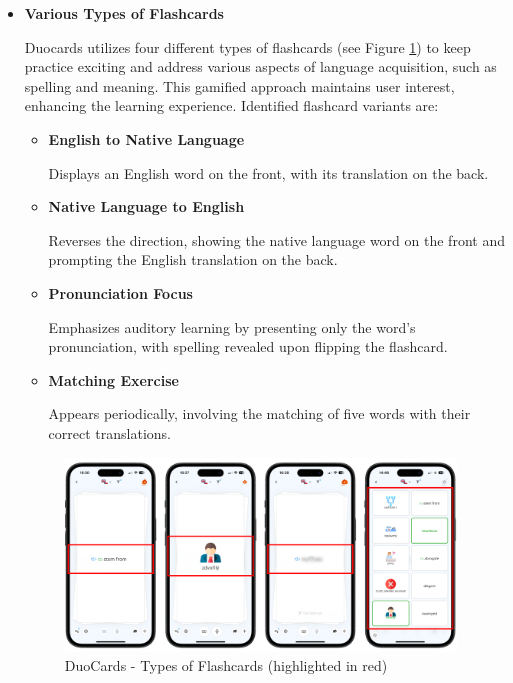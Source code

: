 \begin{itemize}
    \item \textbf{Various Types of Flashcards}

    Duocards utilizes four different types of flashcards (see Figure \ref{fig:duocards-flashcard-types}) to keep practice exciting and address various aspects of language acquisition, such as spelling and meaning. This gamified approach maintains user interest, enhancing the learning experience. Identified flashcard variants are:

    \begin{itemize} 
         \item \textbf{English to Native Language}
         
         Displays an English word on the front, with its translation on the back. 

         \item \textbf{Native Language to English}
         
         Reverses the direction, showing the native language word on the front and prompting the English translation on the back.
         
        \item \textbf{Pronunciation Focus}
        
        Emphasizes auditory learning by presenting only the word’s pronunciation, with spelling revealed upon flipping the flashcard. 
        
        \item \textbf{Matching Exercise}
        
        Appears periodically, involving the matching of five words with their correct translations. 
    
    \end{itemize}

    \begin{figure}[!h]
        \includegraphics[width=0.98\textwidth]{src/figures/duocards-flashcard-types.png}
        \caption{DuoCards - Types of Flashcards (highlighted in red)}
        \label{fig:duocards-flashcard-types}
    \end{figure}
    

\end{itemize}
